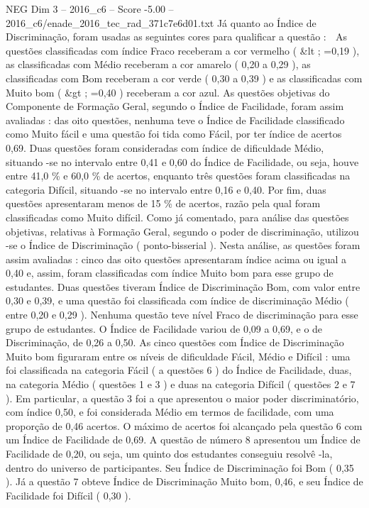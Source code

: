 \begin{textsample}{NEG Dim 3 – 2016\_c6 – Score -5.00 – 2016\_c6/enade\_2016\_tec\_rad\_371c7e6d01.txt}
Já quanto ao Índice de Discriminação, foram usadas as seguintes cores para qualificar a questão :  As questões classificadas com índice Fraco receberam a cor vermelho ( \&lt ; =0,19 ), as classificadas com Médio receberam a cor amarelo ( 0,20 a 0,29 ), as classificadas com Bom receberam a cor verde ( 0,30 a 0,39 ) e as classificadas com Muito bom ( \&gt ; =0,40 ) receberam a cor azul.
As questões objetivas do Componente de Formação Geral, segundo o Índice de Facilidade, foram assim avaliadas : das oito questões, nenhuma teve o Índice de Facilidade classificado como Muito fácil e uma questão foi tida como Fácil, por ter índice de acertos 0,69.
Duas questões foram consideradas com índice de dificuldade Médio, situando -se no intervalo entre 0,41 e 0,60 do Índice de Facilidade, ou seja, houve entre 41,0 \% e 60,0 \% de acertos, enquanto três questões foram classificadas na categoria Difícil, situando -se no intervalo entre 0,16 e 0,40.
Por fim, duas questões apresentaram menos de 15 \% de acertos, razão pela qual foram classificadas como Muito difícil.
Como já comentado, para análise das questões objetivas, relativas à Formação Geral, segundo o poder de discriminação, utilizou -se o Índice de Discriminação ( ponto-bisserial ).
Nesta análise, as questões foram assim avaliadas : cinco das oito questões apresentaram índice acima ou igual a 0,40 e, assim, foram classificadas com índice Muito bom para esse grupo de estudantes.
Duas questões tiveram Índice de Discriminação Bom, com valor entre 0,30 e 0,39, e uma questão foi classificada com índice de discriminação Médio ( entre 0,20 e 0,29 ).
Nenhuma questão teve nível Fraco de discriminação para esse grupo de estudantes.
O Índice de Facilidade variou de 0,09 a 0,69, e o de Discriminação, de 0,26 a 0,50.
As cinco questões com Índice de Discriminação Muito bom figuraram entre os níveis de dificuldade Fácil, Médio e Difícil : uma foi classificada na categoria Fácil ( a questões 6 ) do Índice de Facilidade, duas, na categoria Médio ( questões 1 e 3 ) e duas na categoria Difícil ( questões 2 e 7 ).
Em particular, a questão 3 foi a que apresentou o maior poder discriminatório, com índice 0,50, e foi considerada Médio em termos de facilidade, com uma proporção de 0,46 acertos.
O máximo de acertos foi alcançado pela questão 6 com um Índice de Facilidade de 0,69.
A questão de número 8 apresentou um Índice de Facilidade de 0,20, ou seja, um quinto dos estudantes conseguiu resolvê -la, dentro do universo de participantes.
Seu Índice de Discriminação foi Bom ( 0,35 ).
Já a questão 7 obteve Índice de Discriminação Muito bom, 0,46, e seu Índice de Facilidade foi Difícil ( 0,30 ).

\end{textsample}
